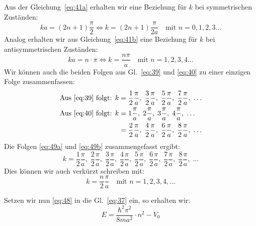 Aus der Gleichung~\eqref{eq:41a} erhalten wir eine Beziehung für $k$ bei
symmetrischen Zuständen:
\begin{equation}
  \label{eq:39}
  ka=(2n+1)\frac \pi 2
  \Leftrightarrow k = (2n+1)\frac \pi {2a} 
  \quad \text{mit } n=0,1,2,3\dots
\end{equation}
Analog erhalten wir aus Gleichung~\eqref{eq:41b} eine Beziehung für $k$ bei
antisymmetrischen Zuständen:
\begin{equation}
  \label{eq:40}
  ka=n \cdot \pi \Leftrightarrow k = \frac {n\pi} {a} 
  \quad \text{mit } n=1,2,3,4\dots
\end{equation}
Wir können auch die beiden Folgen aus Gl.~\eqref{eq:39} und \eqref{eq:40} zu
einer einzigen Folge zusammenfassen:
\begin{subequations}
\begin{align}
  \text{Aus \eqref{eq:39} folgt: }
  k &= \frac 1 2\frac {\pi} a,\; \frac 3 2 \frac {\pi} a,\; 
  \frac 5 2\frac {\pi} a,\; \frac 7 2 \frac {\pi} a,\; \dots\label{eq:49a}\\
  \text{Aus \eqref{eq:40} folgt: }
  k &= 1 \frac {\pi} a,\; 2 \frac {\pi} a,\; 
  3\frac {\pi} a,\; 4 \frac {\pi} a,\; \dots\notag\\
  &= \frac 2 2\frac {\pi} a,\; \frac 4 2 \frac {\pi} a,\; 
  \frac 6 2\frac {\pi} a,\; \frac 8 2 \frac {\pi} a,\; \dots\label{eq:49b}
\end{align}
\end{subequations}
Die Folgen \eqref{eq:49a} und \eqref{eq:49b} zusammengefasst ergibt:
\begin{equation*}
  k =  \frac 1 2\frac {\pi} a,\;  \frac 2 2\frac {\pi} a,\; 
  \frac 3 2\frac {\pi} a,\;  \frac 4 2\frac {\pi} a,\;
  \frac 5 2\frac {\pi} a,\;  \frac 6 2\frac {\pi} a,\;
  \frac 7 2\frac {\pi} a,\;  \frac 8 2\frac {\pi} a,\; \dots
\end{equation*}
Dies können wir auch verkürzt schreiben mit:
\begin{equation}
  \label{eq:48}
  k=\frac n 2 \frac \pi a \quad \text{mit } n=1, 2, 3, 4, \dots
\end{equation}

Setzen wir nun \eqref{eq:48} in die Gl.~\eqref{eq:37} ein, so erhalten wir:
\begin{equation}
  \label{eq:50}
  E=\frac{\hbar^2 \pi^2}{8ma^2}\cdot n^2-V_0  
\end{equation}

